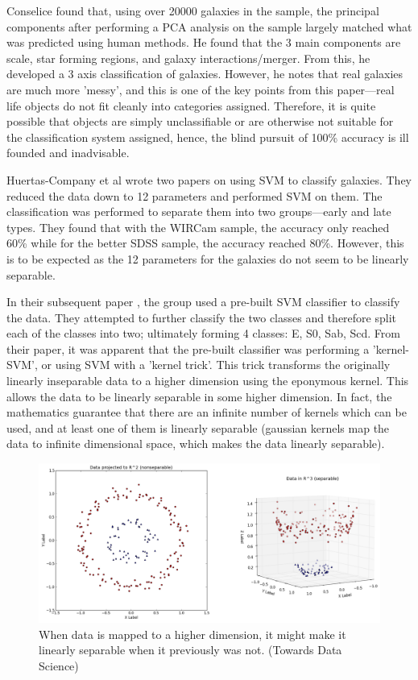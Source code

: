 \documentclass[a4paper,11pt]{article}
\begin{document}
Conselice \cite{conselice_2006_the} found that, using over 20000 galaxies in the sample, the principal components after performing a PCA analysis on the sample largely matched what was predicted using human methods. He found that the 3 main components are scale, star forming regions, and galaxy interactions/merger. From this, he developed a 3 axis classification of galaxies. However, he notes that real galaxies are much more 'messy', and this is one of the key points from this paper—real life objects do not fit cleanly into categories assigned. Therefore, it is quite possible that objects are simply unclassifiable or are otherwise not suitable for the classification system assigned, hence, the blind pursuit of 100\% accuracy is ill founded and inadvisable.

Huertas-Company et al \cite{huertascompany_2007_a} wrote two papers on using SVM to classify galaxies. They reduced the data down to 12 parameters and performed SVM on them. The classification was performed to separate them into two groups—early and late types. They found that with the WIRCam sample, the accuracy only reached 60\% while for the better SDSS sample, the accuracy reached 80\%. However, this is to be expected as the 12 parameters for the galaxies do not seem to be linearly separable.

In their subsequent paper \cite{huertascompany_2010_revisiting}, the group used a pre-built SVM classifier to classify the data. They attempted to further classify the two classes and therefore split each of the classes into two; ultimately forming 4 classes: E, S0, Sab, Scd. From their paper, it was apparent that the pre-built classifier was performing a 'kernel-SVM', or using SVM with a 'kernel trick'. This trick transforms the originally linearly inseparable data to a higher dimension using the eponymous kernel. This allows the data to be linearly separable in some higher dimension. In fact, the mathematics guarantee that there are an infinite number of kernels which can be used, and at least one of them is linearly separable (gaussian kernels map the data to infinite dimensional space, which makes the data linearly separable). 
\begin{figure}[ht]
\centering
\includegraphics[width=\textwidth]{kernelSVM.png}
\caption{\label{fig:kernelSVM}When data is mapped to a higher dimension, it might make it linearly separable when it previously was not. (Towards Data Science)}
\end{figure}
\end{document}
